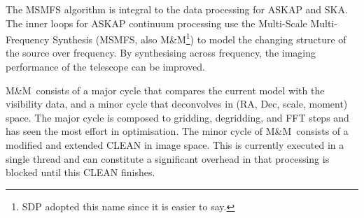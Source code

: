 \documentclass[11pt,a4paper,variablewidth]{article}
\begin{document}

\newcommand{\Wim}{{{\W^{\rm im}}}}
\newcommand{\Wimd}{{{{\W^{\rm im}}^\dag}}}
\newcommand{\Wnt}{{{\W^{\rm {mfs}}_t}}}
\newcommand{\Wntd}{{{{\W^{\rm {mfs}}_t}^\dag}}}
\newcommand{\Wnp}{{{\W^{\rm mfs}_p}}}
\newcommand{\Wnpd}{{{{\W^{\rm mfs}_p}^\dag}}}
\newcommand{\Wnq}{{{\W^{\rm mfs}_q}}}
\newcommand{\Wnqd}{{{{\W^{\rm {mfs}}_q}^\dag}}}
\newcommand{\Wimn}{{{\W^{\rm im}_{\nu}}}}
\newcommand{\Wimnd}{{{{\W^{\rm im}_{\nu}}^\dag}}}

\newcommand{\wnt}{{w_{\nu}^t}}
\newcommand{\wnq}{{w_{\nu}^q}}
\newcommand{\wntq}{{w_{\nu}^{t+q}}}

\newcommand{\pd}{{\partial}}
\newcommand{\mi}{{m_{I}}}
\newcommand{\R}{{R}}
\newcommand{\Rd}{{R^\dag}}
\newcommand{\I}{{\vec{I}}}

\newcommand{\Nt}{N_{\rm Taylor}}
\newcommand{\Ns}{N_{\rm scales}}
\newcommand{\Nc}{N_{\rm chan}}
\newcommand{\Np}{N_{\rm pix}}
\newcommand{\Nf}{N_{\rm Facet}}

\newcommand{\MAM}{M\&M}

\newcommand{\ARL}{ARL}


\sdplistoffigures


\sdpsummary

The MSMFS algorithm is integral to the data processing for ASKAP and SKA. The inner loops for ASKAP continuum processing use the Multi-Scale Multi-Frequency Synthesis (MSMFS, also \MAM\footnote{SDP adopted this name since it is easier to say.}) to model the changing structure of the source over frequency. By synthesising across frequency, the imaging performance of the telescope can be improved.

\MAM\ consists of a major cycle that compares the current model with the visibility data, and a minor cycle that deconvolves in (RA, Dec, scale, moment) space. The major cycle is composed to gridding, degridding, and FFT steps and has seen the most effort in optimisation. The minor cycle of \MAM\ consists of a modified and extended CLEAN in image space. This is currently executed in a single thread and can constitute a significant overhead in that processing is blocked until this CLEAN finishes.
\end{document}
